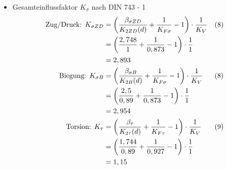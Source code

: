 \begin{itemize}
\[	\]
\item Gesamteinflussfaktor $K_{\sigma}$ nach DIN 743 - 1
	\begin{align*}
		\text{Zug/Druck: } K_{\sigma ZD} &= \left( \frac{\beta_{\sigma ZD}}{K_{2ZD} (d)} + \frac{1}{K_{F\sigma}} -1\right) \cdot \frac{1}{K_V} & (8) \\
		&= \left( \frac{2,748}{1} + \frac{1}{0,873} -1\right) \cdot \frac{1}{1} \\
		&= 2,893 \\
		\text{Biegung: } K_{\sigma B} &= \left( \frac{\beta_{\sigma B}}{K_{2B}(d)} + \frac{1}{K_{F\sigma}} -1\right) \cdot \frac{1}{K_V} & (8) \\
		&= \left( \frac{2,5}{0,89} + \frac{1}{0,873} -1\right) \cdot \frac{1}{1} \\
		&= 2,954 \\
		\text{Torsion: } K_{\tau} &= \left( \frac{\beta_{\tau}}{K_{2\tau}(d)} + \frac{1}{K_{F\tau}} -1\right) \cdot \frac{1}{K_V} & (9) \\
		&= \left( \frac{1,744}{0,89} + \frac{1}{0,927} -1\right) \cdot \frac{1}{1} \\
		&= 1,15 
	\end{align*}
\end{itemize}
